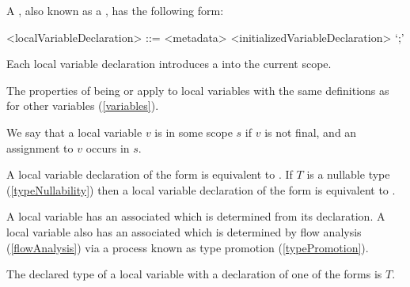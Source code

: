 \documentclass[makeidx]{article}
\begin{document}
{\LMHash{}%
A ,
also known as a ,
has the following form:

\begin{grammar}
<localVariableDeclaration> ::= <metadata> <initializedVariableDeclaration> `;'
\end{grammar}

\LMHash{}%
Each local variable declaration introduces
a 
into the current scope.


\LMHash{}%
The properties of being
 or
apply to local variables with the same definitions as for other variables
(\ref{variables}).

\LMHash{}%
We say that a local variable $v$ is 
in some scope $s$
if $v$ is not final, and an assignment to $v$ occurs in $s$.

\LMHash{}%
A local variable declaration of the form  is equivalent to
.
If $T$ is a nullable type
(\ref{typeNullability})
then a local variable declaration of the form 
is equivalent to .


\LMHash{}%
A local variable has an associated
which is determined from its declaration.
A local variable also has an associated
which is determined by flow analysis
(\ref{flowAnalysis})
via a process known as type promotion
(\ref{typePromotion}).

\LMHash{}%
The declared type of a local variable with a declaration of one of the forms
is $T$.

}
\end{document}
